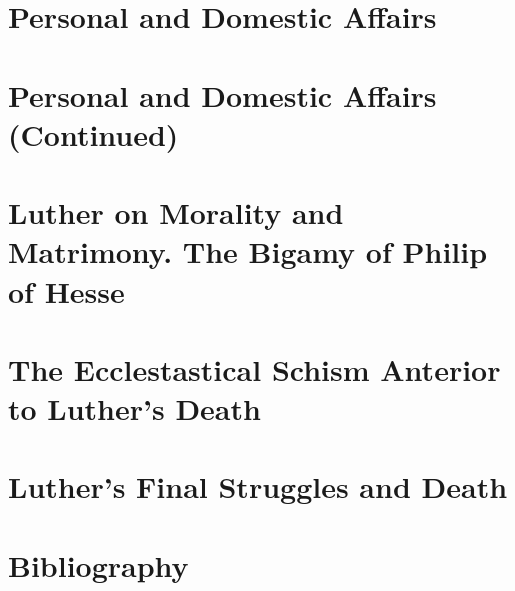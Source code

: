 \chapter{Personal and Domestic Affairs}



\chapter{Personal and Domestic Affairs (Continued)}



\chapter{Luther on Morality and Matrimony. The Bigamy of Philip of Hesse}




\chapter{The Ecclestastical Schism Anterior to Luther’s Death}



\chapter{Luther’s Final Struggles and Death}





\chapter{Bibliography}
\begin{hangparas}{1em}{1} %
	
\end{hangparas}
